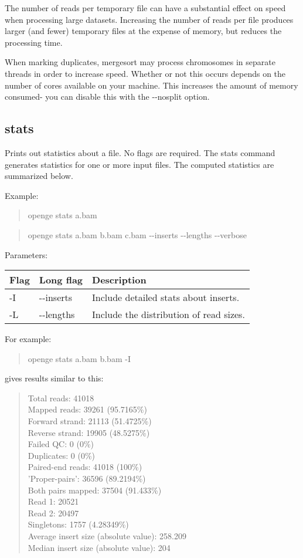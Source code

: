 \documentclass[11pt]{article}
\newcommand {\cmd}[1] {\begin{quote}#1\end{quote}}
\begin{document}
The number of reads per temporary file can have a substantial effect on speed when processing large datasets. Increasing the number of reads per file produces larger (and fewer) temporary files at the expense of memory, but reduces the processing time.

When marking duplicates, mergesort may process chromosomes in separate threads in order to increase speed. Whether or not this occurs depends on the number of cores available on your machine. This increases the amount of memory consumed- you can disable this with the {-}{-}nosplit option.

\subsection{stats}
Prints out statistics about a file. No flags are required.
The stats command generates statistics for one or more input files. The computed statistics are summarized below.

Example:

\cmd{openge stats a.bam}
\cmd{openge stats a.bam b.bam c.bam {-}{-}inserts {-}{-}lengths {-}{-}verbose}
Parameters:
\begin{center}
\begin{tabular}{llp{3.5in}}
\hline
Flag&Long flag&Description\\ \hline
-I&{-}{-}inserts&Include detailed stats about inserts.\\
-L&{-}{-}lengths&Include the distribution of read sizes.\\
\end{tabular}
\end{center}

For example:
\cmd {openge stats a.bam b.bam -I}
gives results similar to this:
\cmd {Total reads:       41018\\
Mapped reads:      39261	(95.7165\%)\\
Forward strand:    21113	(51.4725\%)\\
Reverse strand:    19905	(48.5275\%)\\
Failed QC:         0	(0\%)\\
Duplicates:        0	(0\%)\\
Paired-end reads:  41018	(100\%)\\
'Proper-pairs':    36596	(89.2194\%)\\
Both pairs mapped: 37504	(91.433\%)\\
Read 1:            20521\\
Read 2:            20497\\
Singletons:        1757	(4.28349\%)\\
Average insert size (absolute value): 258.209\\
Median insert size (absolute value): 204}
\end{document}
